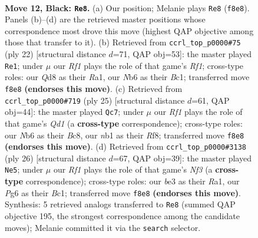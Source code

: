 \documentclass[11pt]{article}
\begin{document}
\clearpage

\begin{figure}[p]\centering
\begin{subfigure}{0.46\textwidth}\centering
\resizebox{\linewidth}{!}{%
\newchessgame
\chessboard[
  setfen={rnbq1rk1/pp3pbp/1n1p2p1/8/3P4/1B2B3/PP3PPP/RN1QNRK1 b - - 0 12},
  showmover=false,
  pgfstyle=straightmove, color=movearrow, markmove={f8-e8}
]}
\caption{}
\end{subfigure}\hfill
\begin{subfigure}{0.46\textwidth}\centering
\resizebox{\linewidth}{!}{%
\newchessgame
\chessboard[
  setfen={r1bq1rk1/pp3ppp/3bpn2/8/3P4/2N3P1/PP3PBP/R1BQ1RK1 w - - 3 12},
  showmover=false,
  pgfstyle=straightmove, color=movearrow, markmove={f1-e1}
]}
\caption{}
\end{subfigure}
\\[4pt]
\begin{subfigure}{0.46\textwidth}\centering
\resizebox{\linewidth}{!}{%
\newchessgame
\chessboard[
  setfen={r1bq1rk1/pp3pbp/1n1p2p1/8/2Pp4/BP6/P2P1PPP/RN1QRBK1 b - c3 0 13},
  showmover=false,
  pgfstyle=straightmove, color=movearrow, markmove={d8-c7}
]}
\caption{}
\end{subfigure}\hfill
\begin{subfigure}{0.46\textwidth}\centering
\resizebox{\linewidth}{!}{%
\newchessgame
\chessboard[
  setfen={rn1q1rk1/pp3ppp/2pb2b1/8/2BP2P1/2P2N1P/P4P2/R1BQ1RK1 w - - 1 14},
  showmover=false,
  pgfstyle=straightmove, color=movearrow, markmove={f3-e5}
]}
\caption{}
\end{subfigure}
\caption{\textbf{Move 12, Black: \texttt{Re8}.} (a) Our position; Melanie plays \texttt{Re8} (\texttt{f8e8}). Panels (b)--(d) are the retrieved master positions whose correspondence most drove this move (highest QAP objective among those that transfer to it). (b) Retrieved from \texttt{ccrl\_top\_p0000\#75} (ply 22) [structural distance $d$=71, QAP obj=53]: the master played \texttt{Re1}; under $\mu$ our \emph{Rf1} plays the role of that game's \emph{Rf1}; cross-type roles: our \emph{Q}d8 as their \emph{R}a1, our \emph{N}b6 as their \emph{B}c1; transferred move \texttt{f8e8} \textbf{(endorses this move)}. (c) Retrieved from \texttt{ccrl\_top\_p0000\#719} (ply 25) [structural distance $d$=61, QAP obj=44]: the master played \texttt{Qc7}; under $\mu$ our \emph{Rf1} plays the role of that game's \emph{Qd1} (a \textbf{cross-type} correspondence); cross-type roles: our \emph{N}b6 as their \emph{B}c8, our \emph{n}b1 as their \emph{R}f8; transferred move \texttt{f8e8} \textbf{(endorses this move)}. (d) Retrieved from \texttt{ccrl\_top\_p0000\#3138} (ply 26) [structural distance $d$=67, QAP obj=39]: the master played \texttt{Ne5}; under $\mu$ our \emph{Rf1} plays the role of that game's \emph{Nf3} (a \textbf{cross-type} correspondence); cross-type roles: our \emph{b}e3 as their \emph{R}a1, our \emph{P}g6 as their \emph{B}c1; transferred move \texttt{f8e8} \textbf{(endorses this move)}. Synthesis: 5 retrieved analogs transferred to \texttt{Re8} (summed QAP objective 195, the strongest correspondence among the candidate moves); Melanie committed it via the \texttt{search} selector.}
\label{fig:thought-m23}
\end{figure}
\end{document}
